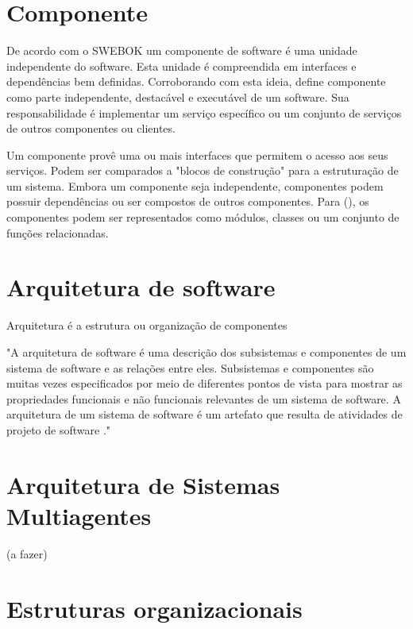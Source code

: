 \section{Componente}



De acordo com o SWEBOK \cite{swebok} um componente de software é uma unidade independente do software. Esta unidade é compreendida em interfaces e dependências bem definidas. Corroborando com esta ideia, \citeauthor{buschmann2007} define componente como parte independente, destacável e executável de um software. Sua responsabilidade é implementar um serviço específico ou um conjunto de serviços de outros componentes ou clientes. 

Um componente provê uma ou mais interfaces que permitem o acesso aos seus serviços. Podem ser comparados a "blocos de construção" para a estruturação de um sistema. Embora um componente seja independente, componentes podem possuir dependências ou ser compostos de outros componentes. Para \citeauthor{buschmann2007} (\citeyear{buschmann2007}), os componentes podem ser representados como módulos, classes ou um conjunto de funções relacionadas. 

\section{Arquitetura de software}

Arquitetura é a estrutura ou organização de componentes 

\begin{citacao}
"A arquitetura de software é uma descrição dos subsistemas e componentes de um sistema de software e as relações entre eles. Subsistemas e componentes são muitas vezes especificados por meio de diferentes pontos de vista para mostrar as propriedades funcionais e não funcionais relevantes de um sistema de software. A arquitetura de um sistema de software é um artefato que resulta de atividades de projeto de software \cite{buschmann2007}."
\end{citacao}

\section{Arquitetura de Sistemas Multiagentes}


(a fazer)

\section{Estruturas organizacionais}

\cite{kolp2006}
